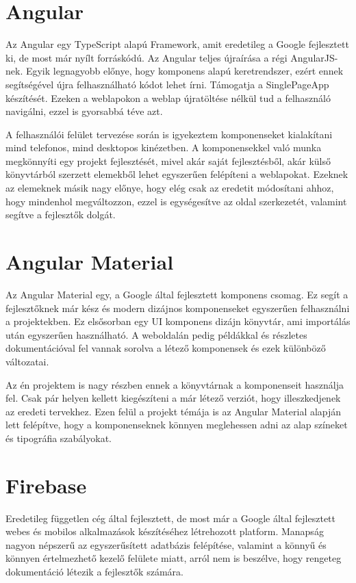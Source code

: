 \documentclass[12pt]{report}
\theoremstyle{definition}
\begin{document}
\section{Angular}
Az Angular egy \Gls{TypeScript} alapú \Gls{Framework}, amit  eredetileg a Google fejlesztett ki, de most már nyílt forráskódú. Az Angular teljes újraírása a régi \Gls{AngularJS}-nek. Egyik legnagyobb előnye, hogy komponens alapú keretrendszer, ezért ennek segítségével újra felhasználható kódot lehet írni. Támogatja a \Gls{SinglePageApp} készítését. Ezeken a weblapokon a weblap újratöltése nélkül tud a felhasználó navigálni, ezzel is gyorsabbá téve azt.

A felhasználói felület tervezése során is igyekeztem komponenseket kialakítani mind telefonos, mind desktopos kinézetben. 
A komponensekkel való munka megkönnyíti egy projekt fejlesztését, mivel akár saját fejlesztésből, akár külső könyvtárból szerzett elemekből lehet egyszerűen felépíteni a weblapokat. 
Ezeknek az elemeknek másik nagy előnye, hogy elég csak az eredetit módosítani ahhoz, hogy mindenhol megváltozzon, ezzel is egységesítve az oldal szerkezetét, valamint segítve a fejlesztők dolgát.


\section{Angular Material} 
Az Angular Material egy, a Google által fejlesztett komponens csomag. 
Ez segít a fejlesztőknek már kész és modern dizájnos komponenseket egyszerűen felhasználni a projektekben. 
Ez elsősorban egy UI komponens dizájn könyvtár, ami importálás után egyszerűen használható. 
A weboldalán pedig példákkal és részletes dokumentációval fel vannak sorolva a létező komponensek és ezek különböző változatai.

Az én projektem is nagy részben ennek a könyvtárnak a komponenseit használja fel. 
Csak pár helyen kellett kiegészíteni a már létező verziót, hogy illeszkedjenek az eredeti tervekhez. 
Ezen felül a projekt témája is az Angular Material alapján lett felépítve, hogy a komponenseknek könnyen meglehessen adni az alap színeket és tipográfia szabályokat.


\section{Firebase}
Eredetileg független cég által fejlesztett, de most már a Google által fejlesztett webes és mobilos alkalmazások készítéséhez létrehozott platform. 
Manapság nagyon népszerű az egyszerűsített adatbázis felépítése, valamint a könnyű és könnyen értelmezhető kezelő felülete miatt, arról nem is beszélve, hogy rengeteg dokumentáció létezik a fejlesztők számára.
\end{document}
